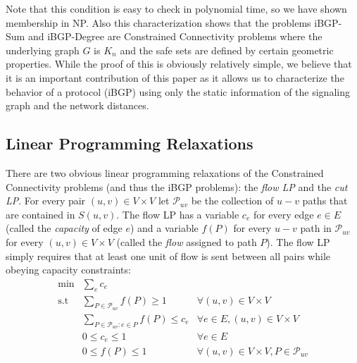 \documentclass[11pt,letterpaper]{article}
\theoremstyle{definition}
\begin{document}
Note that this condition is easy to check in polynomial time, so we
have shown membership in NP.
Also this characterization shows that the problems
{\sc iBGP-Sum} and {\sc iBGP-Degree} are Constrained Connectivity
problems where the underlying graph $G$ is $K_n$ and the safe sets are defined by certain geometric properties.  While the proof of this is obviously relatively simple, we believe that it is an important contribution of this paper as it allows us to characterize the behavior of a protocol (iBGP) using only the static information of the signaling graph and the network distances.

\subsection{Linear Programming Relaxations}

There are two obvious linear programming relaxations of the {\sc
  Constrained Connectivity} problems (and thus the iBGP problems): the \emph{flow LP} and the
\emph{cut LP}.  For every pair $(u,v) \in V \times V$ let
$\mathcal{P}_{uv}$ be the collection of $u-v$ paths that are contained
in $S(u,v)$.  The flow LP has a variable $c_e$ for every edge $e \in
E$ (called the \emph{capacity} of edge $e$) and a variable $f(P)$ for
every $u-v$ path in $\mathcal{P}_{uv}$ for every $(u,v) \in V \times
V$ (called the \emph{flow} assigned to path $P$).  The flow LP simply
requires that at least one unit of flow is sent between all pairs
while obeying capacity constraints:
\begin{align*}
\min &  \textstyle\sum_e c_e \\
\text{s.t} &\textstyle \sum_{P \in \mathcal{P}_{uv}} f(P) \geq 1 & \forall (u,v) \in V \times V \\
&\textstyle \sum_{P \in \mathcal{P}_{uv} : e \in P} f(P) \leq c_e & \forall e \in E, (u,v) \in V \times V \\
& 0 \leq c_e \leq 1 & \forall e \in E \\
& 0 \leq f(P) \leq 1 & \forall (u,v) \in V \times V, P \in \mathcal{P}_{uv}
\end{align*}
\end{document}
